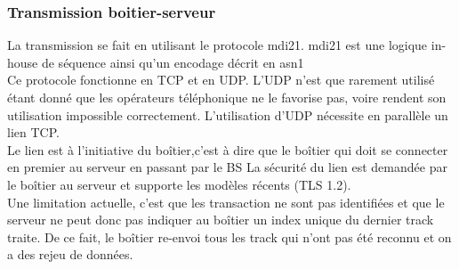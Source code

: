         \subsubsection{Transmission boitier-serveur }
        La transmission se fait en utilisant le protocole \gls{mdi21}. \gls{mdi21} est une logique in-house de séquence 
        ainsi qu’un encodage décrit en \gls{asn1}\\
        Ce protocole fonctionne en TCP et en UDP. L’UDP n’est que rarement utilisé étant 
        donné que les opérateurs téléphonique ne le favorise pas, voire rendent son utilisation impossible correctement.
        L’utilisation d’UDP nécessite en parallèle un lien TCP.\\
        Le lien est à l’initiative du boîtier,c'est à dire que le boîtier qui doit se connecter en premier au serveur en passant par le \gls{BS}
        La sécurité du lien est demandée par le boîtier au serveur et supporte les modèles récents (TLS 1.2).\\
        Une limitation actuelle, c’est que les transaction ne sont pas identifiées et que le serveur ne peut donc pas indiquer 
        au boîtier un index unique du dernier track traite. De ce fait, le boîtier re-envoi tous les track qui n’ont pas été 
        reconnu et on a des rejeu de données.